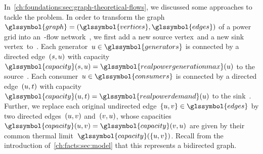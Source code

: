     
    \label{ch:facts:problem:min-cost-s-t-flow-problem-decision-problem}
\endgroup
% 
In~\cref{ch:foundations:sec:graph-theoretical-flows}, we discussed some
approaches to tackle the problem. In order to transform the
graph~$\glssymbol{graph} = ( \glssymbol{vertices}, \glssymbol{edges} )$ of a
power grid into an~\source-\sink flow network~, we first add
a new source vertex~\source and a new sink vertex~\sink to~.
Each generator~$\vertexa \in \glssymbol{generators}$ is connected by a directed
edge~$(s,u)$ with capacity~$\glssymbol{capacity} (\source,\vertexa)
= \glssymbol{realpowergenerationmax}(\vertexa)$ to the source~\source. Each
consumer~$\vertexa \in \glssymbol{consumers}$ is connected by a directed edge~$
(u,t)$ with capacity~$\glssymbol{capacity} (\vertexa,\sink) =
\glssymbol{realpowerdemand}(\vertexa)$ to the sink~\sink. Further, we replace
each original undirected edge~$\{ \vertexa,\vertexb \} \in \glssymbol{edges}$ by
two directed edges~$(u,v)$ and~$(v,u)$, whose
capacities~$\glssymbol{capacity}(\vertexa, \vertexb) =
\glssymbol{capacity}(\vertexb, \vertexa)$ are given by their common thermal
limit~$\glssymbol{capacity}( \{ \vertexa, \vertexb \} )$. Recall from the
introduction of~\cref{ch:facts:sec:model} that this represents a bidirected
graph.

